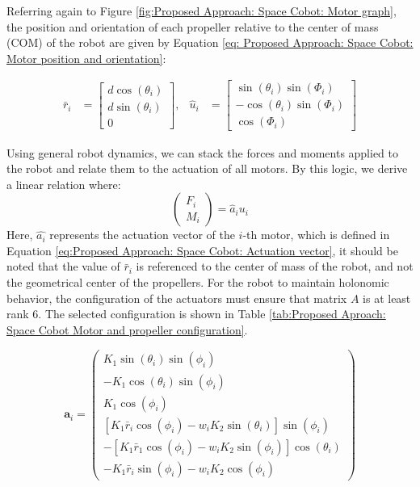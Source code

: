 Referring again to Figure \ref{fig:Proposed Approach: Space Cobot: Motor graph}, the position and orientation of each propeller relative to the center of mass (COM) of the robot are given by Equation \ref{eq: Proposed Approach: Space Cobot: Motor position and orientation}:

\begin{align}
    \bar{r}_{i} &= \begin{bmatrix}
        d \cos(\theta_{i}) \\ 
        d \sin(\theta_{i}) \\
        0
    \end{bmatrix}, &
    \hat{u}_{i} &= \begin{bmatrix}
        \sin(\theta_{i}) \sin(\Phi_{i}) \\
        -\cos(\theta_{i}) \sin(\Phi_{i}) \\
        \cos(\Phi_{i})
    \end{bmatrix}
    \label{eq: Proposed Approach: Space Cobot: Motor position and orientation}
\end{align}

Using general robot dynamics, we can stack the forces and moments applied to the robot and relate them to the actuation of all motors. By this logic, we derive a linear relation where:
\[
\begin{pmatrix} F_{i} \\ M_{i}  \end{pmatrix} = \hat{a}_{i} u_{i}
\]
Here, \(\hat{a_i}\) represents the actuation vector of the \(i\)-th motor, which is defined in Equation \ref{eq:Proposed Approach: Space Cobot: Actuation vector}, it should be noted that the value of  \( \bar{r}_i \) is referenced to the center of mass of the robot, and not the geometrical center of the propellers. For the robot to maintain holonomic behavior, the configuration of the actuators must ensure that matrix \(A\) is at least rank 6. The selected configuration is shown in Table \ref{tab:Proposed Aproach: Space Cobot Motor and propeller configuration}.

\begin{equation}
\mathbf{a}_i = 
\begin{pmatrix}
K_1 \sin(\theta_i) \sin(\phi_i) \\
-K_1 \cos(\theta_i) \sin(\phi_i) \\
K_1 \cos(\phi_i) \\
[K_1 \bar{r}_i \cos(\phi_i) - w_i K_2 \sin(\theta_i)] \sin(\phi_i) \\
-[K_1 \bar{r}_1 \cos(\phi_i) - w_i K_2 \sin(\phi_i)] \cos(\theta_i) \\
-K_1 \bar{r}_i \sin(\phi_i) - w_i K_2 \cos(\phi_i)
\end{pmatrix}
\label{eq:Proposed Approach: Space Cobot: Actuation vector}
\end{equation}

